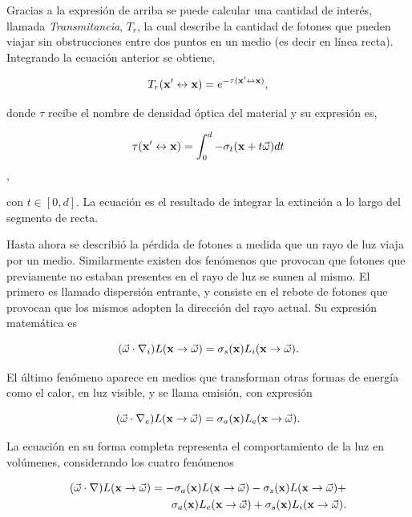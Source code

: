 Gracias a la expresión de arriba se puede calcular una cantidad de interés, llamada {\em Transmitancia}, $T_{r}$, la cual describe la cantidad de fotones que pueden viajar sin obstrucciones entre dos puntos en un medio (es decir en línea recta).
Integrando la ecuación anterior se obtiene,

$$T_{r}(\bold{x'} \leftrightarrow \bold{x}) = e^{-\tau(\bold{x'} \leftrightarrow \bold{x})},$$

donde $\tau$ recibe el nombre de densidad óptica del material y su expresión es,

$$\tau(\bold{x'} \leftrightarrow \bold{x}) = \int_{0}^{d} -\sigma_{t}(\bold{x}+t\vec{\omega})dt$$,

con $t \in [0,d]$.
La ecuación es el resultado de integrar la extinción a lo largo del segmento de recta.


Hasta ahora se describió la pérdida de fotones a medida que un rayo de luz viaja por un medio.
Similarmente existen dos fenómenos que provocan que fotones que previamente no estaban presentes en el rayo de luz se sumen al mismo.
El primero es llamado dispersión entrante, y consiste en el rebote de fotones que provocan que los mismos adopten la dirección del rayo actual.
Su expresión matemática es

$$ (\vec{\omega} \cdot \nabla_{i}) L(\bold{x} \rightarrow \vec{\omega}) = \sigma_{s}(\bold{x}) L_{i}(\bold{x} \rightarrow \vec{\omega}).$$

El último fenómeno aparece en medios que transforman otras formas de energía como el calor, en luz visible, y se llama emisión, con expresión

$$ (\vec{\omega} \cdot \nabla_{e}) L(\bold{x} \rightarrow \vec{\omega}) = \sigma_{a}(\bold{x}) L_{e}(\bold{x} \rightarrow \vec{\omega}).$$

La ecuación en su forma completa representa el comportamiento de la luz en volúmenes, considerando los cuatro fenómenos

\begin{equation}
\begin{aligned}
(\vec{\omega} \cdot \nabla) L(\bold{x} \rightarrow \vec{\omega}) = - \sigma_{a}(\bold{x}) L(\bold{x} \rightarrow \vec{\omega}) - \sigma_{s}(\bold{x}) L(\bold{x} \rightarrow \vec{\omega}) + \\
\sigma_{a}(\bold{x}) L_{e}(\bold{x} \rightarrow \vec{\omega}) + \sigma_{s}(\bold{x}) L_{i}(\bold{x} \rightarrow \vec{\omega}).
\end{aligned}
\end{equation}

